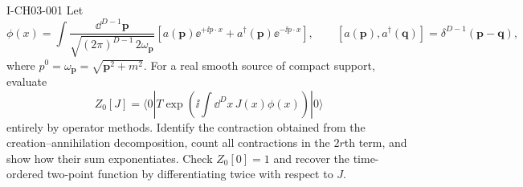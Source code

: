 \begin{exercise}{I-CH03-001}
Let
\[
 \phi(x)=\int\frac{\dd^{D-1}\mathbf p}{\sqrt{(2\pi)^{D-1}\,2\omega_{\mathbf p}}}
 \left[a(\mathbf p)\ee^{+\ii p\mathbin{\cdot}x}+a^\dagger(\mathbf p)\ee^{-\ii p\mathbin{\cdot}x}\right],
 \qquad [a(\mathbf p),a^\dagger(\mathbf q)]=\delta^{D-1}(\mathbf p-\mathbf q),
\]
where $p^0=\omega_{\mathbf p}=\sqrt{\mathbf p^2+m^2}$.  For a real smooth
source of compact support, evaluate
\[
 Z_0[J]=\langle0|T\exp\!\left(\ii\int\dd^D x\,J(x)\phi(x)\right)|0\rangle
\]
entirely by operator methods.  Identify the contraction obtained from the
creation--annihilation decomposition, count all contractions in the $2r$th
term, and show how their sum exponentiates.  Check $Z_0[0]=1$ and recover the
time-ordered two-point function by differentiating twice with respect to $J$.
\end{exercise}
